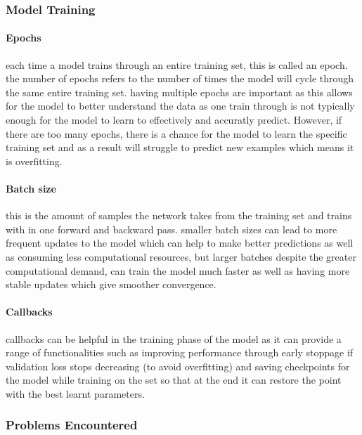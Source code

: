 \documentclass[]{final_report}
\begin{document}
\subsubsection{Model Training}

\paragraph{Epochs}
each time a model trains through an entire training set, this is called an epoch. the number of epochs refers to the number of times the model will cycle through the same entire training set. having multiple epochs are important as this allows for the model to better understand the data as one train through is not typically enough for the model to learn to effectively and accuratly predict. However, if there are too many epochs, there is a chance for the model to learn the specific training set and as a result will struggle to predict new examples which means it is overfitting.

\paragraph{Batch size}
this is the amount of samples the network takes from the training set and trains with in one forward and backward pass. smaller batch sizes can lead to more frequent updates to the model which can help to make better predictions as well as consuming less computational resources, but larger batches despite the greater computational demand, can train the model much faster as well as having more stable updates which give smoother convergence.

\paragraph{Callbacks}
callbacks can be helpful in the training phase of the model as it can provide a range of functionalities such as improving performance through early stoppage if validation loss stops decreasing (to avoid overfitting) and saving checkpoints for the model while training on the set so that at the end it can restore the point with the best learnt parameters.

\subsubsection{Problems Encountered}
\end{document}
